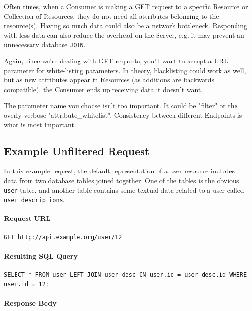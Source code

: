 \documentclass{book}
\begin{document}
Often times, when a Consumer is making a GET request to a specific Resource or Collection of Resources, they do not need all attributes belonging to the resource(s). Having so much data could also be a network bottleneck. Responding with less data can also reduce the overhead on the Server, e.g. it may prevent an unnecessary database \texttt{JOIN}.

Again, since we're dealing with GET requests, you'll want to accept a URL parameter for white-listing parameters. In theory, blacklisting could work as well, but as new attributes appear in Resources (as additions are backwards compatible), the Consumer ends up receiving data it doesn't want.

The parameter name you choose isn't too important. It could be "filter" or the overly-verbose "attribute\_whitelist". Consistency between different Endpoints is what is most important.

\subsection{Example Unfiltered Request}

In this example request, the default representation of a user resource includes data from two database tables joined together. One of the tables is the obvious \texttt{user} table, and another table contains some textual data related to a user called \texttt{user\_descriptions}.

\paragraph{\textbf{Request URL}}

\begin{verbatim}
GET http://api.example.org/user/12
\end{verbatim}

\paragraph{\textbf{Resulting SQL Query}}

\begin{verbatim}
SELECT * FROM user LEFT JOIN user_desc ON user.id = user_desc.id WHERE user.id = 12;
\end{verbatim}

\paragraph{\textbf{Response Body}}
\end{document}
